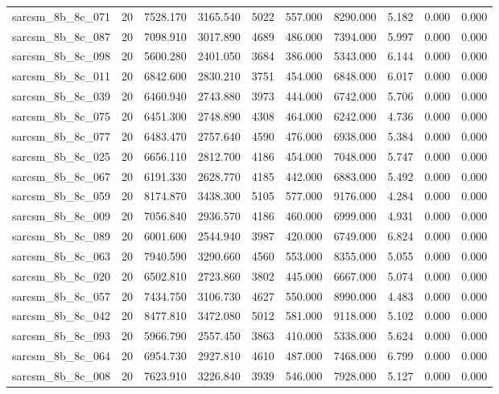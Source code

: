 \begin{tabular}{lrrrrrrrrr}
sarcsm\_8b\_8c\_071 & 20 & 7528.170 & 3165.540 & 5022 & 557.000 & 8290.000 & 5.182 & 0.000 & 0.000 \\
sarcsm\_8b\_8c\_087 & 20 & 7098.910 & 3017.890 & 4689 & 486.000 & 7394.000 & 5.997 & 0.000 & 0.000 \\
sarcsm\_8b\_8c\_098 & 20 & 5600.280 & 2401.050 & 3684 & 386.000 & 5343.000 & 6.144 & 0.000 & 0.000 \\
sarcsm\_8b\_8c\_011 & 20 & 6842.600 & 2830.210 & 3751 & 454.000 & 6848.000 & 6.017 & 0.000 & 0.000 \\
sarcsm\_8b\_8c\_039 & 20 & 6460.940 & 2743.880 & 3973 & 444.000 & 6742.000 & 5.706 & 0.000 & 0.000 \\
sarcsm\_8b\_8c\_075 & 20 & 6451.300 & 2748.890 & 4308 & 464.000 & 6242.000 & 4.736 & 0.000 & 0.000 \\
sarcsm\_8b\_8c\_077 & 20 & 6483.470 & 2757.640 & 4590 & 476.000 & 6938.000 & 5.384 & 0.000 & 0.000 \\
sarcsm\_8b\_8c\_025 & 20 & 6656.110 & 2812.700 & 4186 & 454.000 & 7048.000 & 5.747 & 0.000 & 0.000 \\
sarcsm\_8b\_8c\_067 & 20 & 6191.330 & 2628.770 & 4185 & 442.000 & 6883.000 & 5.492 & 0.000 & 0.000 \\
sarcsm\_8b\_8c\_059 & 20 & 8174.870 & 3438.300 & 5105 & 577.000 & 9176.000 & 4.284 & 0.000 & 0.000 \\
sarcsm\_8b\_8c\_009 & 20 & 7056.840 & 2936.570 & 4186 & 460.000 & 6999.000 & 4.931 & 0.000 & 0.000 \\
sarcsm\_8b\_8c\_089 & 20 & 6001.600 & 2544.940 & 3987 & 420.000 & 6749.000 & 6.824 & 0.000 & 0.000 \\
sarcsm\_8b\_8c\_063 & 20 & 7940.590 & 3290.660 & 4560 & 553.000 & 8355.000 & 5.055 & 0.000 & 0.000 \\
sarcsm\_8b\_8c\_020 & 20 & 6502.810 & 2723.860 & 3802 & 445.000 & 6667.000 & 5.074 & 0.000 & 0.000 \\
sarcsm\_8b\_8c\_057 & 20 & 7434.750 & 3106.730 & 4627 & 550.000 & 8990.000 & 4.483 & 0.000 & 0.000 \\
sarcsm\_8b\_8c\_042 & 20 & 8477.810 & 3472.080 & 5012 & 581.000 & 9118.000 & 5.102 & 0.000 & 0.000 \\
sarcsm\_8b\_8c\_093 & 20 & 5966.790 & 2557.450 & 3863 & 410.000 & 5338.000 & 5.624 & 0.000 & 0.000 \\
sarcsm\_8b\_8c\_064 & 20 & 6954.730 & 2927.810 & 4610 & 487.000 & 7468.000 & 6.799 & 0.000 & 0.000 \\
sarcsm\_8b\_8c\_008 & 20 & 7623.910 & 3226.840 & 3939 & 546.000 & 7928.000 & 5.127 & 0.000 & 0.000 \\

\end{tabular}
